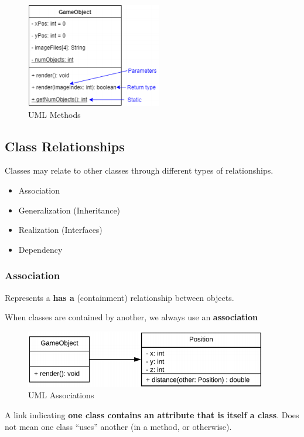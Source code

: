 \documentclass[]{article}
\providecommand{\tightlist}{%
  \setlength{\itemsep}{0pt}\setlength{\parskip}{0pt}}
\begin{document}
\begin{figure}
\centering
\includegraphics{images/uml3.png}
\caption{UML Methods}
\end{figure}

\hypertarget{class-relationships}{%
\subsection{Class Relationships}\label{class-relationships}}

Classes may relate to other classes through different types of
relationships.

\begin{itemize}
\tightlist
\item
  Association
\item
  Generalization (Inheritance)
\item
  Realization (Interfaces)
\item
  Dependency
\end{itemize}

\hypertarget{association}{%
\subsubsection{Association}\label{association}}

Represents a \textbf{has a} (containment) relationship between objects.

When classes are contained by another, we always use an
\textbf{association}

\begin{figure}
\centering
\includegraphics{images/uml4.png}
\caption{UML Associations}
\end{figure}

A link indicating \textbf{one class contains an attribute that is itself
a class}. Does not mean one class ``uses'' another (in a method, or
otherwise).
\end{document}
